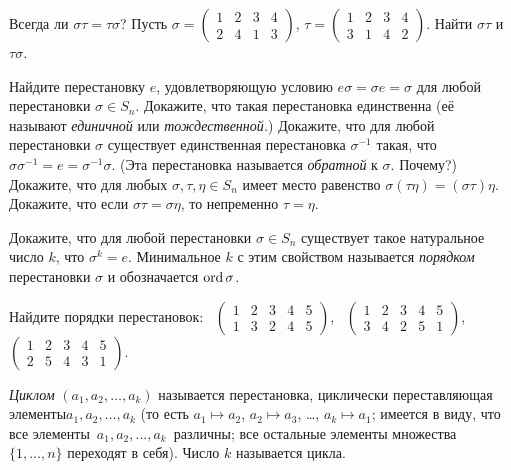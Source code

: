 \documentclass[a4paper, 11pt]{article}
\begin{document}
Всегда ли $\sigma\tau=\tau\sigma$?
Пусть
$\sigma=\displaystyle\begin{pmatrix}1&2&3&4\\2&4&1&3\end{pmatrix}$,
$\tau=\displaystyle\begin{pmatrix}1&2&3&4\\3&1&4&2\end{pmatrix}$.
Найти $\sigma\tau$ и $\tau\sigma$.

Найдите перестановку $e$, удовлетворяющую условию $e\sigma=\sigma
e=\sigma$ для любой перестановки $\sigma\in S_n$.
Докажите, что такая перестановка единственна
(е\"е называют \emph{единичной} или \emph{тождественной.})
Докажите, что для любой перестановки $\sigma$ существует
единственная перестановка $\sigma^{-1}$ такая, что
$\sigma\sigma^{-1}=e=\sigma^{-1}\sigma$. (Эта перестановка
называется \emph{обратной} к $\sigma$. Почему?)
Докажите, что для любых $\sigma,\tau,\eta\in S_n$ имеет место
равенство $\sigma(\tau\eta)=(\sigma\tau)\eta$.
Докажите, что если $\sigma\tau=\sigma\eta$, то непременно
$\tau=\eta$.

Докажите, что для любой перестановки $\sigma\in S_n$ существует
такое натуральное число $k$, что $\sigma^k=e$. Минимальное $k$ с
этим свойством называется \emph{порядком} перестановки $\sigma$ и
обозначается $\operatorname{ord}\sigma$.

\label{perm1}
Найдите порядки перестановок: \
$\displaystyle\begin{pmatrix}1&2&3&4&5\\1&3&2&4&5\end{pmatrix}$,
\
$\displaystyle\begin{pmatrix}1&2&3&4&5\\3&4&2&5&1\end{pmatrix}$,
\
$\displaystyle\begin{pmatrix}1&2&3&4&5\\2&5&4&3&1\end{pmatrix}$.
\кзадача

\опр
\emph{Циклом} $(a_1,a_2,\dots,a_k)$ называется перестановка,
циклически переставляющая элементы\break $a_1,a_2,\dots,a_k$ (то есть
$a_1\mapsto a_2$, $a_2\mapsto a_3$, \dots, $a_k\mapsto a_1$;
имеется в виду, что все
элементы~\hbox{$a_1,a_2,\dots,a_k$}~раз\-ли\-ч\-ны; все
остальные элементы множества $\{1,\dots,n\}$ переходят в себя).
Число $k$ называется  цикла.
\копр
\end{document}
